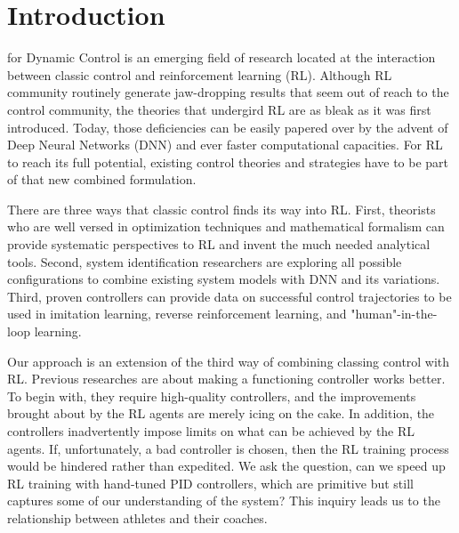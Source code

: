 \documentclass[journal]{IEEEtran}
\begin{document}
\section{Introduction}
 for Dynamic Control is an emerging field of research located at the interaction between classic control and reinforcement learning (RL). Although RL community routinely generate jaw-dropping results that seem out of reach to the control community\cite{Andrychowicz2020LearningDI}\cite{Kalashnikov2018QTOptSD}\cite{Lee2020LearningQL}, the theories that undergird RL are as bleak as it was first introduced\cite{Bertsekas1996NeuroDynamicP}. Today, those deficiencies can be easily papered over by the advent of Deep Neural Networks (DNN) and ever faster computational capacities. For RL to reach its full potential, existing control theories and strategies have to be part of that new combined formulation.

There are three ways that classic control finds its way into RL. First, theorists who are well versed in optimization techniques and mathematical formalism can provide systematic perspectives to RL and invent the much needed analytical tools\cite{Han2020ActorCriticRL}\cite{Weinan2017APO}\cite{Dupont2019AugmentedNO}\cite{Betancourt2018OnSO}\cite{Nachum2020ReinforcementLV}. Second, system identification researchers are exploring all possible configurations to combine existing system models with DNN and its variations\cite{Hewing2020LearningBasedMP}\cite{Mohan2020EmbeddingHP}\cite{Lusch2018DeepLF}\cite{Bai2019DeepEM}\cite{BelbutePeres2020CombiningDP}. Third, proven controllers can provide data on successful control trajectories to be used in imitation learning, reverse reinforcement learning, and "human"-in-the-loop learning\cite{Knox2009InteractivelySA}\cite{Knox2010CombiningMF}\cite{Peng2018DeepMimicED}\cite{Peng2020LearningAR}\cite{Paine2018OneShotHI}.

Our approach is an extension of the third way of combining classing control with RL. Previous researches\cite{Xie2018LearningWT}\cite{Carlucho2017IncrementalQS}\cite{Pavse2020RIDMRI} are about making a functioning controller works better. To begin with, they require high-quality controllers, and the improvements brought about by the RL agents are merely icing on the cake. In addition, the controllers inadvertently impose limits on what can be achieved by the RL agents. If, unfortunately, a bad controller is chosen, then the RL training process would be hindered rather than expedited. We ask the question, can we speed up RL training with hand-tuned PID controllers, which are primitive but still captures some of our understanding of the system? This inquiry leads us to the relationship between athletes and their coaches. 
\end{document}
